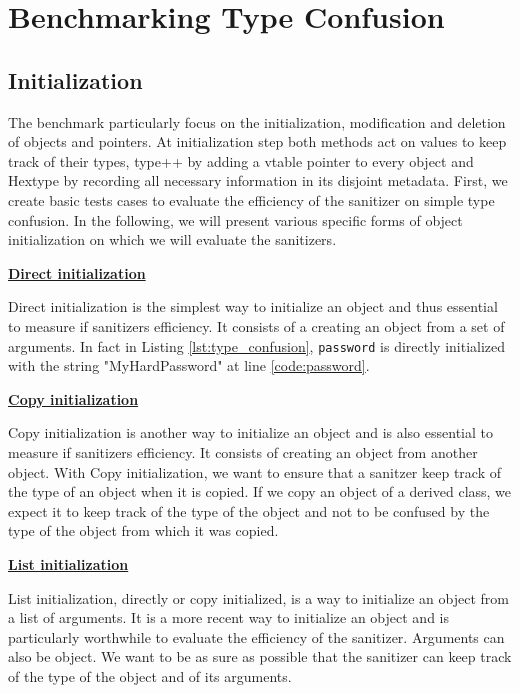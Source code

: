 \documentclass[a4paper,11pt,oneside]{report}
\begin{document}
\section{Benchmarking Type Confusion}

\subsection{Initialization}

The benchmark particularly focus on the initialization, modification and deletion of objects and pointers. At initialization step 
both methods act on values to keep track of their types, type++ by adding a vtable pointer to every object and Hextype by 
recording all necessary information in its disjoint metadata. 
First, we create basic tests cases to evaluate the efficiency of the sanitizer 
on simple type confusion. In the following, we will present various specific forms of object initialization on which 
we will evaluate the sanitizers.

\textbf{\href{https://en.cppreference.com/w/cpp/language/direct_initialization}{Direct initialization}}

\noindent{}Direct initialization is the simplest way to initialize an object and thus essential to measure if 
sanitizers efficiency. It consists of a creating an object from a set of arguments. 
In fact in Listing \autoref{lst:type_confusion}, \texttt{password} is directly initialized with the string "MyHardPassword"
at line \ref{code:password}. 

\textbf{\href{https://en.cppreference.com/w/cpp/language/copy_initialization}{Copy initialization}}

\noindent{}Copy initialization is another way to initialize an object and is also essential to measure if
sanitizers efficiency. It consists of creating an object from another object. With Copy initialization, we want to 
ensure that a sanitzer keep track of the type of an object when it is copied. If we copy an object of a derived class,
we expect it to keep track of the type of the object and not to be confused by the type of the object from which it was copied.

\textbf{\href{https://en.cppreference.com/w/cpp/language/list_initialization}{List initialization}}

\noindent{}List initialization, directly or copy initialized, is a way to initialize an object from a list of arguments.
It is a more recent way to initialize an object and is particularly worthwhile to evaluate the efficiency of the sanitizer.
Arguments can also be object. We want to be as sure as possible that the sanitizer can keep track of the type of the object
and of its arguments. 
\end{document}
